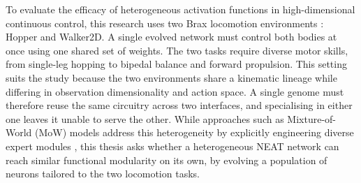 \documentclass[12pt]{article}
\begin{document}
To evaluate the efficacy of heterogeneous activation functions in high-dimensional continuous control, this research uses two Brax locomotion environments \parencite{freeman_brax_2021}: Hopper and Walker2D.
A single evolved network must control both bodies at once using one shared set of weights.
The two tasks require diverse motor skills, from single-leg hopping to bipedal balance and forward propulsion.
This setting suits the study because the two environments share a kinematic lineage while differing in observation dimensionality and action space. A single genome must therefore reuse the same circuitry across two interfaces, and specialising in either one leaves it unable to serve the other.
While approaches such as Mixture-of-World (MoW) models address this heterogeneity by explicitly engineering diverse expert modules \parencite{zhang_mixtureofworld_2026}, this thesis asks whether a heterogeneous NEAT network can reach similar functional modularity on its own, by evolving a population of neurons tailored to the two locomotion tasks.



\end{document}
